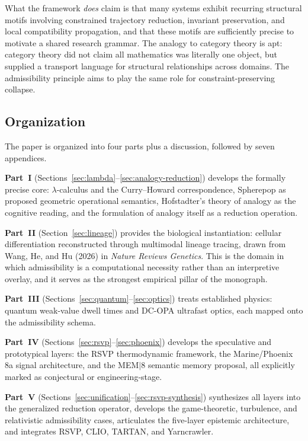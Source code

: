 \documentclass[12pt, a4paper]{article}
\theoremstyle{plain}
\theoremstyle{definition}
\theoremstyle{remark}
\begin{document}
What the framework \emph{does} claim is that many systems exhibit
recurring structural motifs involving constrained trajectory reduction,
invariant preservation, and local compatibility propagation, and that
these motifs are sufficiently precise to motivate a shared research
grammar.
The analogy to category theory is apt: category theory did not claim
all mathematics was literally one object, but supplied a transport
language for structural relationships across domains.
The admissibility principle aims to play the same role for
constraint-preserving collapse.

\subsection{Organization}

The paper is organized into four parts plus a discussion, followed by
seven appendices.

\textbf{Part~I} (Sections~\ref{sec:lambda}--\ref{sec:analogy-reduction})
develops the formally precise core: $\lambda$-calculus and the
Curry--Howard correspondence, Spherepop as proposed geometric operational
semantics, Hofstadter's theory of analogy as the cognitive reading, and
the formulation of analogy itself as a reduction operation.

\textbf{Part~II} (Section~\ref{sec:lineage}) provides the biological
instantiation: cellular differentiation reconstructed through multimodal
lineage tracing, drawn from Wang, He, and Hu (2026) in
\textit{Nature Reviews Genetics}.
This is the domain in which admissibility is a computational necessity
rather than an interpretive overlay, and it serves as the strongest
empirical pillar of the monograph.

\textbf{Part~III} (Sections~\ref{sec:quantum}--\ref{sec:optics})
treats established physics: quantum weak-value dwell times and DC-OPA
ultrafast optics, each mapped onto the admissibility schema.

\textbf{Part~IV} (Sections~\ref{sec:rsvp}--\ref{sec:phoenix})
develops the speculative and prototypical layers: the RSVP thermodynamic
framework, the Marine/Phoenix 8a signal architecture, and the MEM$|$8
semantic memory proposal, all explicitly marked as conjectural or
engineering-stage.

\textbf{Part~V} (Sections~\ref{sec:unification}--\ref{sec:rsvp-synthesis})
synthesizes all layers into the generalized reduction operator, develops
the game-theoretic, turbulence, and relativistic admissibility cases,
articulates the five-layer epistemic architecture, and integrates RSVP,
CLIO, TARTAN, and Yarncrawler.
\end{document}
